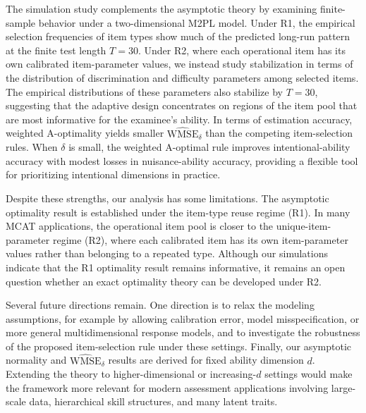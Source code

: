 \documentclass[12pt]{article}
\begin{document}
The simulation study complements the asymptotic theory by examining finite-sample behavior under a two-dimensional M2PL model. Under R1, the empirical selection frequencies of item types show much of the predicted long-run pattern at the finite test length $T=30$. Under R2, where each operational item has its own calibrated item-parameter values, we instead study stabilization in terms of the distribution of discrimination and difficulty parameters among selected items. The empirical distributions of these parameters also stabilize by $T=30$, suggesting that the adaptive design concentrates on regions of the item pool that are most informative for the examinee's ability. In terms of estimation accuracy, weighted A-optimality yields smaller $\widehat{\mathrm{WMSE}}_\delta$ than the competing item-selection rules. When $\delta$ is small, the weighted A-optimal rule improves intentional-ability accuracy with modest losses in nuisance-ability accuracy, providing a flexible tool for prioritizing intentional dimensions in practice.

Despite these strengths, our analysis has some limitations. The asymptotic optimality result is established under the item-type reuse regime (R1). In many MCAT applications, the operational item pool is closer to the unique-item-parameter regime (R2), where each calibrated item has its own item-parameter values rather than belonging to a repeated type. Although our simulations indicate that the R1 optimality result remains informative, it remains an open question whether an exact optimality theory can be developed under R2.

Several future directions remain. One direction is to relax the modeling assumptions, for example by allowing calibration error, model misspecification, or more general multidimensional response models, and to investigate the robustness of the proposed item-selection rule under these settings. Finally, our asymptotic normality and $\widehat{\mathrm{WMSE}}_\delta$ results are derived for fixed ability dimension $d$. Extending the theory to higher-dimensional or increasing-$d$ settings would make the framework more relevant for modern assessment applications involving large-scale data, hierarchical skill structures, and many latent traits.


\vspace{\fill}\pagebreak


\clearpage
\end{document}

